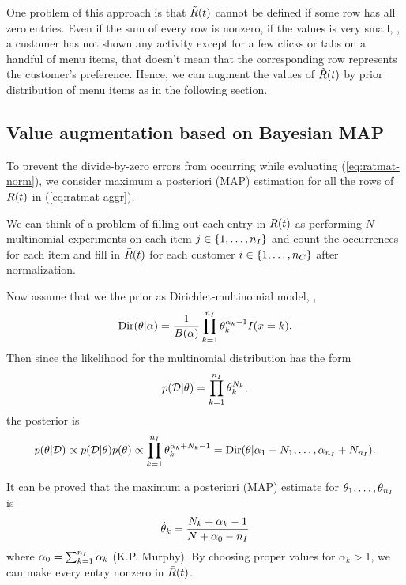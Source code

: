 One problem of this approach is that $\tilde{R}(t)$ cannot be defined if some row has all zero entries.
Even if the sum of every row is nonzero, if the values is very small,
\eg, a customer has not shown any activity except for a few clicks or tabs on a handful of menu items,
that doesn't mean that the corresponding row represents the customer's preference.
Hence, we can augment the values of $\tilde{R}(t)$ by prior distribution of menu items
as in the following section.


\subsection{Value augmentation based on Bayesian MAP}
\label{subsec:bayes-prior}

To prevent the divide-by-zero errors from occurring while evaluating (\ref{eq:ratmat-norm}),
we consider maximum a posteriori (MAP) estimation for all the rows of $\bar{R}(t)$ in (\ref{eq:ratmat-aggr}).

We can think of a problem of filling out each entry in $\bar{R}(t)$
as performing $N$ multinomial experiments on each item $j\in\{1,\ldots,{n_I}\}$
and count the occurrences for each item and fill in $\bar{R}(t)$ for each customer $i\in\{1,\ldots,{n_C}\}$
after normalization.


Now assume that we the prior as Dirichlet-multinomial model,
\ie,
\begin{equation}
\mathrm{Dir}(\theta|\alpha) = \frac{1}{B(\alpha)} \prod_{k=1}^{{n_I}} \theta_k^{\alpha_k-1} I(x = k).
\end{equation}
Then since the likelihood for the multinomial distribution has the form
\begin{equation}
p(\mathcal{D}|\theta) = \prod_{k=1}^{{n_I}} \theta_k^{N_k},
\end{equation}
the posterior is
\begin{equation}
p(\theta|\mathcal{D})
\propto p(\mathcal{D}|\theta)  p(\theta)
\propto \prod_{k=1}^{{n_I}} \theta_k^{\alpha_k+N_k-1}
= \mathrm{Dir}(\theta|\alpha_1+N_1, \ldots, \alpha_{{n_I}} + N_{{n_I}}).
\end{equation}

It can be proved that the maximum a posteriori (MAP) estimate for $\theta_1, \ldots, \theta_{{n_I}}$ is
\begin{equation}
\label{eq:map-estimate}
{\hat{\theta}}_{k} = \frac{N_k + \alpha_k - 1}{N + \alpha_0 -{{n_I}}}
\end{equation}
where $\alpha_0 = \sum_{k=1}^{{n_I}} \alpha_k$ (K.P. Murphy).
By choosing proper values for $\alpha_k > 1$, we can make every entry nonzero in $\bar{R}(t)$.

